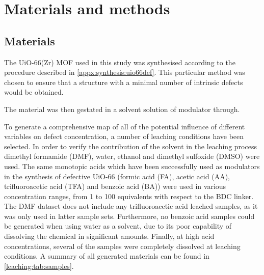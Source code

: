 
\section{Materials and methods}

\subsection{Materials}

The UiO-66(Zr) MOF used in this study was synthesised according
to the procedure described in \autoref{appx:synthesis:uio66def}.
This particular method was chosen to ensure that a structure with
a minimal number of intrinsic defects would be obtained.

The material was then gestated in a solvent solution of modulator
through.

To generate a comprehensive map of all of the potential influence
of different variables on defect concentration, a number of
leaching conditions have been selected. In order to verify the
contribution of the solvent in the leaching process
dimethyl formamide (DMF), water, ethanol and dimethyl sulfoxide (DMSO)
were used. The same monotopic acids which have been successfully used
as modulators in the synthesis of defective UiO-66
(formic acid (FA), acetic acid (AA), trifluoroacetic acid (TFA)
and benzoic acid (BA)) were used in various concentration ranges,
from 1 to 100 equivalents with respect to the BDC linker.
The DMF dataset does not include any trifluoroacetic acid
leached samples, as it was only used in latter sample sets.
Furthermore, no benzoic acid samples could be generated when using
water as a solvent, due to its poor capability of dissolving the
chemical in significant amounts. Finally, at high acid concentrations,
several of the samples were completely dissolved at leaching
conditions.
A summary of all generated materials can be found in
\autoref{leaching:tab:samples}.

